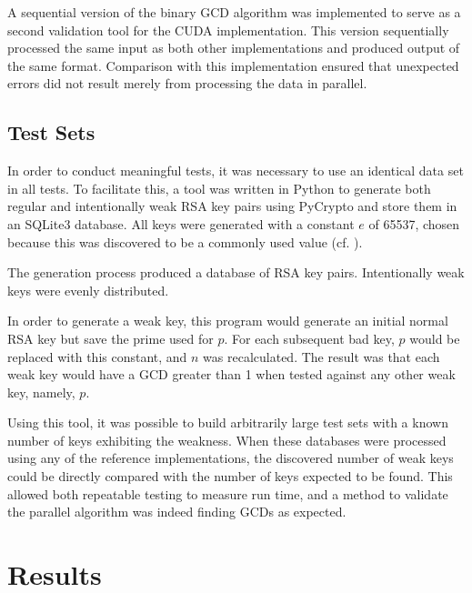 \documentclass[smallextended]{svjour3}       %
\begin{document}
A sequential version of the binary GCD algorithm was implemented to serve as a 
second validation tool for the CUDA implementation. This version sequentially 
processed the same input as both other implementations and produced output of
the same format. Comparison with this implementation ensured that unexpected
errors did not result merely from processing the data in parallel.

\subsection{Test Sets}
\label{subsec:testsets}
In order to conduct meaningful tests, it was necessary to use an identical 
data set in all tests. To facilitate this, a tool was written in Python to 
generate both regular and intentionally weak RSA key pairs using PyCrypto and
store them in an SQLite3 database. All keys were generated with a 
constant $e$ of 65537, chosen because this was discovered to be a commonly used 
value (cf. \cite{lenstra2012ron}).

The generation process produced a database of RSA key pairs. 
Intentionally weak keys were evenly distributed. 

In order to generate a weak key, this program would generate an initial 
normal RSA key but save the prime used for $p$. For each subsequent bad key, 
$p$ would be replaced with this constant, and $n$ was recalculated. The 
result was that each weak key would have a GCD greater than 1 when 
tested against any other weak key, namely, $p$. 

Using this tool, it was possible to build arbitrarily large test sets with a 
known number of keys exhibiting the weakness. When these databases 
were processed using any of the reference implementations, the 
discovered number of weak keys could be directly compared with the 
number of keys expected to be found. This allowed both repeatable testing to 
measure run time, and a method to validate the parallel algorithm was indeed 
finding GCDs as expected. 


\section{Results}
\label{sec:results}
\end{document}
